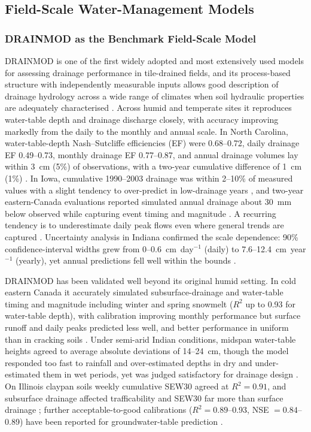 \subsection{Field-Scale Water-Management Models}

\subsubsection{DRAINMOD as the Benchmark Field-Scale Model}

\textsc{DRAINMOD} is one of the first widely adopted and most extensively used models for assessing drainage performance in tile-drained fields, and its process-based structure with independently measurable inputs allows good description of drainage hydrology across a wide range of climates when soil hydraulic properties are adequately characterised \parencite{Singh2019b,Gowda2012}. Across humid and temperate sites it reproduces water-table depth and drainage discharge closely, with accuracy improving markedly from the daily to the monthly and annual scale. In North Carolina, water-table-depth Nash--Sutcliffe efficiencies (EF) were 0.68--0.72, daily drainage EF 0.49--0.73, monthly drainage EF 0.77--0.87, and annual drainage volumes lay within 3~cm (5\%) of observations, with a two-year cumulative difference of 1~cm (1\%) \parencite{Gowda2012}. In Iowa, cumulative 1990--2003 drainage was within 2--10\% of measured values with a slight tendency to over-predict in low-drainage years \parencite{Singh2006b}, and two-year eastern-Canada evaluations reported simulated annual drainage about 30~mm below observed while capturing event timing and magnitude \parencite{Dayyani2009}. A recurring tendency is to underestimate daily peak flows even where general trends are captured \parencite{Morrison2014,Singh1996}. Uncertainty analysis in Indiana confirmed the scale dependence: 90\% confidence-interval widths grew from 0--0.6~cm~day$^{-1}$ (daily) to 7.6--12.4~cm~year$^{-1}$ (yearly), yet annual predictions fell well within the bounds \parencite{Wang2006}.

\textsc{DRAINMOD} has been validated well beyond its original humid setting. In cold eastern Canada it accurately simulated subsurface-drainage and water-table timing and magnitude including winter and spring snowmelt ($R^2$ up to 0.93 for water-table depth), with calibration improving monthly performance but surface runoff and daily peaks predicted less well, and better performance in uniform than in cracking soils \parencite{Dayyani2009,Morrison2014}. Under semi-arid Indian conditions, midspan water-table heights agreed to average absolute deviations of 14--24~cm, though the model responded too fast to rainfall and over-estimated depths in dry and under-estimated them in wet periods, yet was judged satisfactory for drainage design \parencite{GUPTA1993}. On Illinois claypan soils weekly cumulative SEW30 agreed at $R^2=0.91$, and subsurface drainage affected trafficability and SEW30 far more than surface drainage \parencite{MOSTAGHIMI1989}; further acceptable-to-good calibrations ($R^2=0.89$--0.93, NSE $=0.84$--0.89) have been reported for groundwater-table prediction \parencite{Abduljaleel2023,Awad2022b}.

